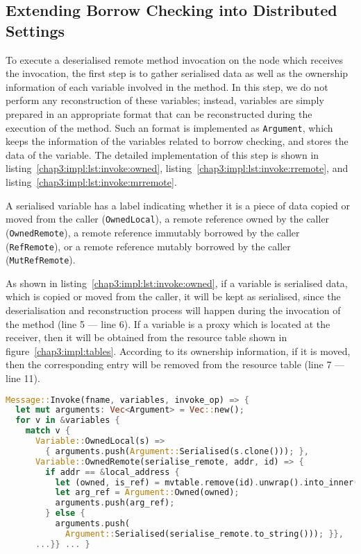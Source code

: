 \subsection{Extending Borrow Checking into Distributed Settings}
\label{chap3:impl:borrow}
To execute a deserialised remote method invocation on the node which receives the invocation, the first step is to gather serialised data as well as the ownership information of each variable involved in the method. In this step, we do not perform any reconstruction of these variables; instead, variables are simply prepared in an appropriate format that can be reconstructed during the execution of the method. Such an format is implemented as \lstinline{Argument}, which keeps the information of the variables related to borrow checking, and stores the data of the variable. The detailed implementation of this step is shown in listing~\ref{chap3:impl:lst:invoke:owned}, listing~\ref{chap3:impl:lst:invoke:rremote}, and listing~\ref{chap3:impl:lst:invoke:mrremote}.

A serialised variable has a label indicating whether it is a piece of data copied or moved from the caller (\lstinline{OwnedLocal}), a remote reference owned by the caller (\lstinline{OwnedRemote}), a remote reference immutably borrowed by the caller (\lstinline{RefRemote}), or a remote reference mutably borrowed by the caller (\lstinline{MutRefRemote}).

As shown in listing~\ref{chap3:impl:lst:invoke:owned}, if a variable is serialised data, which is copied or moved from the caller, it will be kept as serialised, since the deserialisation and reconstruction process will happen during the invocation of the method (line 5 --- line 6).
If a variable is a proxy which is located at the receiver, then it will be obtained from the resource table shown in figure~\ref{chap3:impl:tables}. According to its ownership information, if it is moved, then the corresponding entry will be removed from the resource table (line 7 --- line 11).
\begin{lstlisting}[language=Rust, style=boxed, basicstyle=\footnotesize\ttfamily, caption={Gathering variables from an invocation message: \lstinline{OwnedLocal} and \lstinline{OwnedRemote}}, label=chap3:impl:lst:invoke:owned]
Message::Invoke(fname, variables, invoke_op) => {
  let mut arguments: Vec<Argument> = Vec::new();
  for v in &variables {
    match v {
      Variable::OwnedLocal(s) => 
        { arguments.push(Argument::Serialised(s.clone())); },
      Variable::OwnedRemote(serialise_remote, addr, id) => {
        if addr == &local_address {
          let (owned, is_ref) = mvtable.remove(id).unwrap().into_inner();
          let arg_ref = Argument::Owned(owned);
          arguments.push(arg_ref);
        } else { 
          arguments.push(
            Argument::Serialised(serialise_remote.to_string())); }},
      ...}} ... }
\end{lstlisting}

